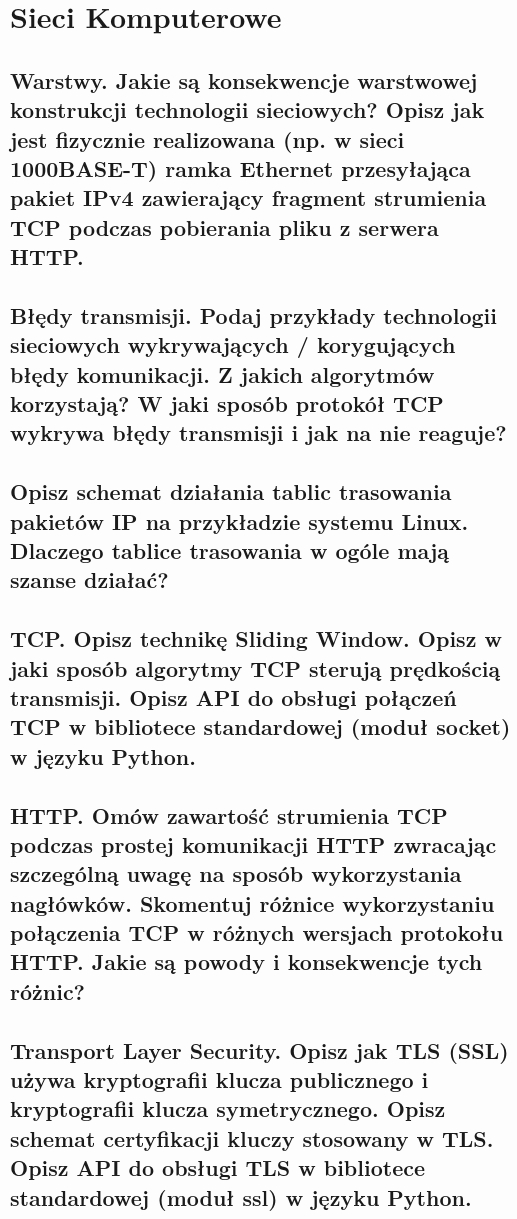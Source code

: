 \chapter{Sieci Komputerowe}

\section{Warstwy. Jakie są konsekwencje warstwowej konstrukcji technologii sieciowych? Opisz jak jest fizycznie realizowana (np. w sieci 1000BASE-T) ramka Ethernet przesyłająca pakiet IPv4 zawierający fragment strumienia TCP podczas pobierania pliku z serwera HTTP.}


\section{Błędy transmisji. Podaj przykłady technologii sieciowych wykrywających / korygujących błędy komunikacji. Z jakich algorytmów korzystają? W jaki sposób protokół TCP wykrywa błędy transmisji i jak na nie reaguje?}


\section{ Opisz schemat działania tablic trasowania pakietów IP na przykładzie systemu Linux. Dlaczego tablice trasowania w ogóle mają szanse działać?}


\section{TCP. Opisz technikę Sliding Window. Opisz w jaki sposób algorytmy TCP sterują prędkością transmisji. Opisz API do obsługi połączeń TCP w bibliotece standardowej (moduł socket) w języku Python.}


\section{HTTP. Omów zawartość strumienia TCP podczas prostej komunikacji HTTP zwracając szczególną uwagę na sposób wykorzystania nagłówków. Skomentuj różnice wykorzystaniu połączenia TCP w różnych wersjach protokołu HTTP. Jakie są powody i konsekwencje tych różnic?}


\section{Transport Layer Security. Opisz jak TLS (SSL) używa kryptografii klucza publicznego i kryptografii klucza symetrycznego. Opisz schemat certyfikacji kluczy stosowany w TLS. Opisz API do obsługi TLS w bibliotece standardowej (moduł ssl) w języku Python.}

